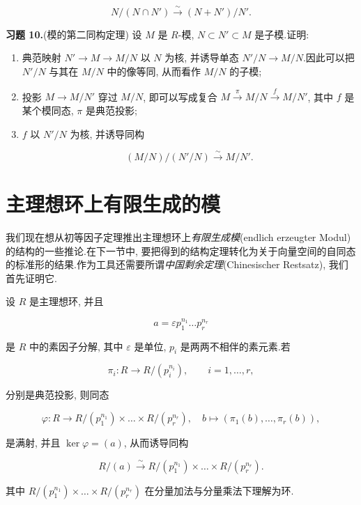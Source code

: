 \[
N/(N \cap N') \xrightarrow{\sim} (N + N')/N'\text{.}\]

\medskip
\noindent\textbf{习题 10.}(模的第二同构定理) 设 $M$ 是 $R$-模, $N \subset N' \subset M$ 是子模.证明:
\begin{enumerate}
\item[(i)] 典范映射 $N' \longrightarrow M \longrightarrow M/N$ 以 $N$ 为核, 并诱导单态 $N'/N \longrightarrow M/N$.因此可以把 $N'/N$ 与其在 $M/N$ 中的像等同, 从而看作 $M/N$ 的子模;
\item[(ii)] 投影 $M \longrightarrow M/N'$ 穿过 $M/N$, 即可以写成复合 $M \xrightarrow{\pi} M/N \xrightarrow{f} M/N'$, 其中 $f$ 是某个模同态, $\pi$ 是典范投影;
\item[(iii)] $f$ 以 $N'/N$ 为核, 并诱导同构

\[
(M/N)/(N'/N) \xrightarrow{\sim} M/N'\text{.}\]
\end{enumerate}


\section{主理想环上有限生成的模}\label{sec:6.4}

我们现在想从初等因子定理推出主理想环上\emph{有限生成模}(\textup{endlich erzeugter Modul})的结构的一些推论.在下一节中, 要把得到的结构定理转化为关于向量空间的自同态的标准形的结果.作为工具还需要所谓\emph{中国剩余定理}(\textup{Chinesischer Restsatz}), 我们首先证明它.

\begin{theorem}[中国剩余定理]\label{thm:6.4.1}
设 $R$ 是主理想环, 并且

\[
a = \varepsilon p_1^{n_1} \ldots p_r^{n_r}\]

是 $R$ 中的素因子分解, 其中 $\varepsilon$ 是单位, $p_i$ 是两两不相伴的素元素.若

\[
\pi_i \colon R \longrightarrow R/(p_i^{n_i}), \qquad i = 1, \ldots, r,\]

分别是典范投影, 则同态

\[
\varphi \colon R \longrightarrow R/(p_1^{n_1}) \times \ldots \times R/(p_r^{n_r}), \quad b \longmapsto (\pi_1(b), \ldots, \pi_r(b)),\]

是满射, 并且 $\ker \varphi = (a)$, 从而诱导同构

\[
R/(a) \xrightarrow{\sim} R/(p_1^{n_1}) \times \ldots \times R/(p_r^{n_r})\text{.}\]

其中 $R/(p_1^{n_1}) \times \ldots \times R/(p_r^{n_r})$ 在分量加法与分量乘法下理解为环.
\end{theorem}

